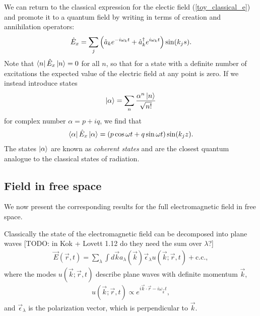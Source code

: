 We can return to the classical expression for the electic field (\ref{toy_classical_e}) and promote it to a quantum field by writing in terms of creation and annihilation operators:
\begin{align}
  \hat{E}_x = \sum_j \left(\hat{a}_k e^{-i\omega_k t} + \hat{a}^\dagger_k e^{i\omega_k t}\right) \sin(k_j s).
\end{align}
Note that $\left\langle n\right\vert\hat{E}_x\left\vert n\right\rangle = 0$ for all $n$, so that for a state with a definite number of excitations the expected value of the electric field at any point is zero. If we instead introduce states
\begin{align}
  \left\vert\alpha\right\rangle = \sum_n \frac{\alpha^n \left\vert n\right\rangle}{\sqrt{n!}}
\end{align}
for complex number $\alpha = p + iq$, we find that
\begin{align}
  \left\langle \alpha\right\vert\hat{E}_x\left\vert\alpha\right\rangle = (p\cos\omega t + q\sin\omega t)\sin(k_j z).
\end{align}
The states $\left\vert\alpha\right\rangle$ are known as \textit{coherent states} and are the closest quantum analogue to the classical states of radiation.

\subsection{Field in free space}

We now present the corresponding results for the full electromagnetic field in free space.

Classically the state of the electromagnetic field can be decomposed into plane waves [TODO: in Kok + Lovett 1.12 do they need the sum over $\lambda$?]
\begin{align}
  \vec{E}(\vec{r}, t) = \sum_\lambda \int d\vec{k} a_\lambda(\vec{k})\vec{\epsilon}_\lambda u(\vec{k}; \vec{r}, t) + \text{c.c.},
\end{align}
where the modes $u(\vec{k}; \vec{r}, t)$ describe plane waves with definite momentum $\vec{k}$,
\begin{align}
  u(\vec{k}; \vec{r}, t) \propto e^{i\vec{k} \cdot \vec{r} - i\omega_\vec{k} t},
\end{align}
and $\vec{\epsilon}_\lambda$ is the polarization vector, which is perpendicular to $\vec{k}$.

